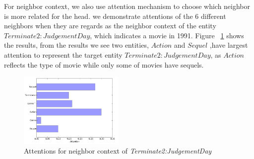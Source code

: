 \begin{table}
 \centering
 \caption{Attention Results in Path Context}
  \label{Attention Results in Path Context}
  \small
\end{table}

For neighbor context, we also use attention mechanism to choose which neighbor is more related for the head. we demonstrate attentions of the 6 different neighbors when they are regards as the neighbor context of the entity $Terminate2:JudgementDay$, which indicates a movie in 1991. Figure ~\ref{pic2}  shows the results, from the results we see two entities, $Action$ and $Sequel$ ,have largest attention to represent the target entity $Terminate2:JudgementDay$, as $Action$  reflects the type of movie while only some of movies have sequels.
\begin{figure}
  \includegraphics[width=0.45\textwidth]{pic2.png}
  \caption{Attentions for neighbor context of  \emph{Terminate2:JudgementDay}}
  \label{pic2}
\end{figure}